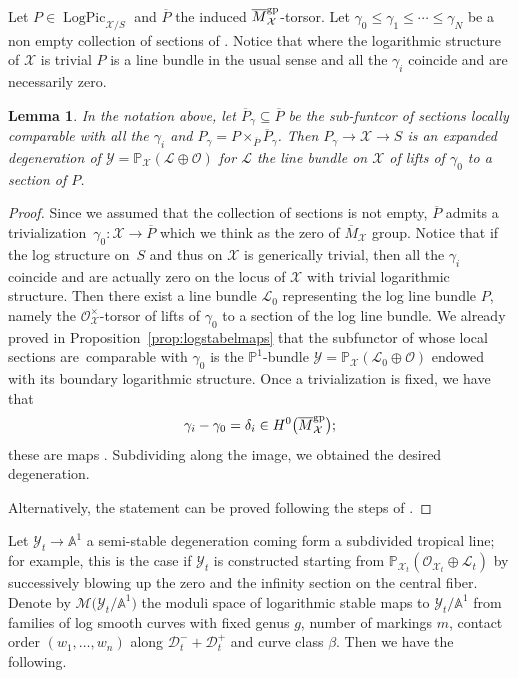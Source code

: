 \documentclass[11pt]{article}
\numberwithin{equation}{section}
\newcommand{\D}{\mathcal{D}}
\renewcommand{\L}{\mathcal{L}}
\newcommand{\M}{\mathcal{M}}
\newcommand{\X}{\mathcal{X}}
\renewcommand{\O}{\mathcal{O}}
\newcommand{\Y}{\mathcal{Y}}
\renewcommand{\leq}{\leqslant}
\renewcommand{\bar}{\overline}
\numberwithin{equation}{section}
\newtheorem{lem}[theo]{Lemma}
\theoremstyle{definition}
\begin{document}
Let $P\in\operatorname{LogPic}_{\X\slash S}$ and
$\bar{P}$ the induced $\bar{M}^{\rm gp}_{\mathcal{X}}$-torsor. Let $\gamma_0\leq\gamma_1\leq\cdots\leq\gamma_N$ be a non empty collection of sections of \smash{$\bar{P}$}. Notice that where the logarithmic structure of $\X$ is trivial $P$ is a line bundle in the usual sense and all the $\gamma_i$ coincide and are necessarily zero.
\begin{lem}\label{lem:tropicaline}
In the notation above, let $\bar{P}_{\gamma}\subseteq \bar{P}$ be the sub-funtcor of sections locally comparable with all the $\gamma_i$ and $P_{\gamma}=P\times_{\bar{P}}\bar{P}_{\gamma}$. Then $P_{\gamma}\to\X\to S$ is an expanded degeneration of $\Y=\mathbb P_{\X}(\L\oplus\O)$ for $\L$ the line bundle on $\X$ of lifts of $\gamma_0$ to a section of $P$.
\end{lem}
\begin{proof}
Since we assumed that the collection of sections is not empty, $\bar{P}$ admits a trivialization~${\gamma_0\colon\X\to\bar{P}}$ which we think as the zero of $\bar{M}_{\X}$ group. Notice that if the log structure on~$S$ and thus on $\X$ is generically trivial, then all the $\gamma_i$ coincide and are actually zero on the locus of $\X$ with trivial logarithmic structure. Then there exist a line bundle $\L_0$ representing the log line bundle $P$, namely the $\O_{\X}^\times$-torsor of lifts of $\gamma_0$ to a section of the log line bundle. We already proved in Proposition~\ref{prop:logstabelmaps} that the subfunctor of \smash{$P=L_0^\times\otimes_{\O_{\X}^\times}M_{\X}^{\rm gp}$} whose local sections are~comparable with $\gamma_0$ is the $\mathbb{P}^1$-bundle $\Y=\mathbb P_{\X}(\L_0\oplus\O)$ endowed with its boundary logarithmic structure.
Once a trivialization is fixed, we have that
\[
\gamma_i-\gamma_0=\delta_i\in H^0\bigl(\bar{M}_{\X}^{\rm gp}\bigr);
\] these are maps \smash{$\operatorname{Trop}(\X)=\operatorname{Trop}(S)\xrightarrow{\delta_i}\operatorname{Trop}(\Y)$}. Subdividing along the image, we obtained the desired degeneration.

 Alternatively, the statement can be proved following the steps of \cite[Proposition~5.2.4]{marcuswiselog}.
\end{proof}

Let $\mathcal Y_t\to\mathbb A^1$ a semi-stable degeneration coming form a subdivided tropical line; for example, this is the case if $\Y_t$ is constructed starting from $\mathbb P_{\X_t}(\O_{\X_t}\oplus\L_t)$ by successively blowing up the zero and the infinity section on the central fiber.
Denote by $\M\bigl(\Y_t\slash\mathbb A^1\bigr)$ the moduli space of logarithmic stable maps to $\Y_t\slash\mathbb A^1$ from families of log smooth curves with fixed genus $g$, number of markings $m$, contact order $(w_1,\dots, w_n)$ along $\D_t^-+\D_t^+$ and curve class $\beta$. Then we have the following.
\end{document}
